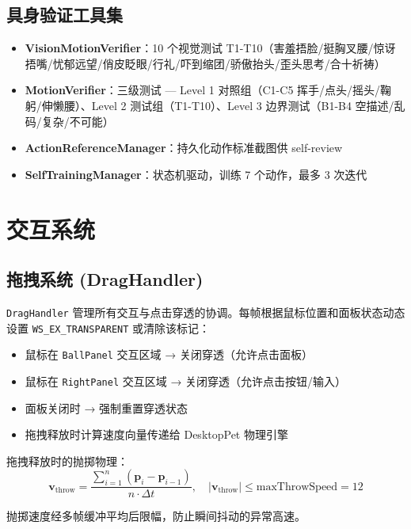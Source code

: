 \documentclass[12pt,a4paper]{ctexart}
\begin{document}
\subsection{具身验证工具集}

\begin{itemize}
    \item \textbf{VisionMotionVerifier}：10 个视觉测试 T1-T10（害羞捂脸/挺胸叉腰/惊讶捂嘴/忧郁远望/俏皮眨眼/行礼/吓到缩团/骄傲抬头/歪头思考/合十祈祷）
    \item \textbf{MotionVerifier}：三级测试 --- Level 1 对照组（C1-C5 挥手/点头/摇头/鞠躬/伸懒腰）、Level 2 测试组（T1-T10）、Level 3 边界测试（B1-B4 空描述/乱码/复杂/不可能）
    \item \textbf{ActionReferenceManager}：持久化动作标准截图供 self-review
    \item \textbf{SelfTrainingManager}：状态机驱动，训练 7 个动作，最多 3 次迭代
\end{itemize}

\section{交互系统}

\subsection{拖拽系统 (DragHandler)}

\texttt{DragHandler} 管理所有交互与点击穿透的协调。每帧根据鼠标位置和面板状态动态设置
\texttt{WS\_EX\_TRANSPARENT} 或清除该标记：

\begin{itemize}
    \item 鼠标在 \texttt{BallPanel} 交互区域 → 关闭穿透（允许点击面板）
    \item 鼠标在 \texttt{RightPanel} 交互区域 → 关闭穿透（允许点击按钮/输入）
    \item 面板关闭时 → 强制重置穿透状态
    \item 拖拽释放时计算速度向量传递给 DesktopPet 物理引擎
\end{itemize}

拖拽释放时的抛掷物理：
\[
\mathbf{v}_{\text{throw}} = \frac{\sum_{i=1}^{n} (\mathbf{p}_{i} - \mathbf{p}_{i-1})}{n \cdot \Delta t},\quad
|\mathbf{v}_{\text{throw}}| \leq \text{maxThrowSpeed}=12
\]

抛掷速度经多帧缓冲平均后限幅，防止瞬间抖动的异常高速。
\end{document}
